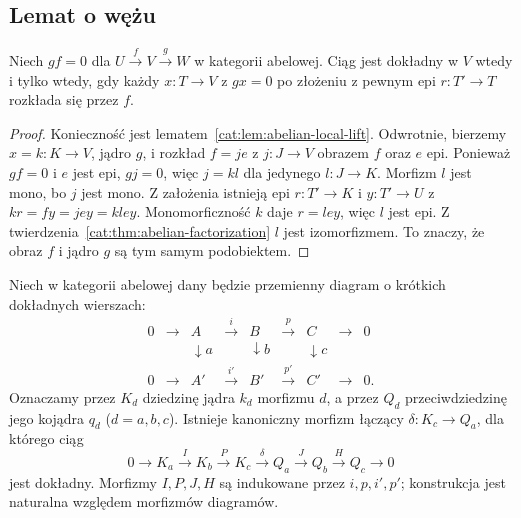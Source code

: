 \subsection{Lemat o wężu}
\begin{lemat}\label{cat:lem:exactness-local-criterion}
Niech $gf=0$ dla $U\xrightarrow{f}V\xrightarrow{g}W$ w kategorii abelowej. Ciąg jest dokładny w $V$ wtedy i tylko wtedy, gdy każdy $x:T\to V$ z $gx=0$ po złożeniu z pewnym epi $r:T'\to T$ rozkłada się przez $f$.
\end{lemat}
\begin{proof}
Konieczność jest lematem~\ref{cat:lem:abelian-local-lift}. Odwrotnie, bierzemy $x=k:K\to V$, jądro $g$, i rozkład $f=je$ z $j:J\to V$ obrazem $f$ oraz $e$ epi. Ponieważ $gf=0$ i $e$ jest epi, $gj=0$, więc $j=kl$ dla jedynego $l:J\to K$. Morfizm $l$ jest mono, bo $j$ jest mono. Z założenia istnieją epi $r:T'\to K$ i $y:T'\to U$ z $kr=fy=jey=kley$. Monomorficzność $k$ daje $r=ley$, więc $l$ jest epi. Z twierdzenia~\ref{cat:thm:abelian-factorization} $l$ jest izomorfizmem. To znaczy, że obraz $f$ i jądro $g$ są tym samym podobiektem.
\end{proof}
\begin{twierdzenie}\label{cat:thm:snake-lemma}
Niech w kategorii abelowej dany będzie przemienny diagram o krótkich dokładnych wierszach:
\[
\begin{array}{ccccccccc}
0&\longrightarrow&A&\xrightarrow{i}&B&\xrightarrow{p}&C&\longrightarrow&0\\
&&\downarrow a&&\downarrow b&&\downarrow c\\
0&\longrightarrow&A'&\xrightarrow{i'}&B'&\xrightarrow{p'}&C'&\longrightarrow&0 .
\end{array}
\]
Oznaczamy przez $K_d$ dziedzinę jądra $k_d$ morfizmu $d$, a przez $Q_d$ przeciwdziedzinę jego kojądra $q_d$ ($d=a,b,c$). Istnieje kanoniczny morfizm łączący $\delta:K_c\to Q_a$, dla którego ciąg
\[
0\to K_a\xrightarrow{I}K_b\xrightarrow{P}K_c
\xrightarrow{\delta}Q_a\xrightarrow{J}Q_b\xrightarrow{H}Q_c\to0
\]
jest dokładny. Morfizmy $I,P,J,H$ są indukowane przez $i,p,i',p'$; konstrukcja jest naturalna względem morfizmów diagramów.
\end{twierdzenie}
